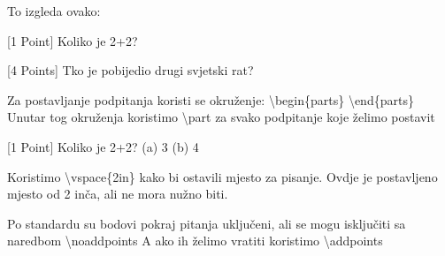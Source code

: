 \documentclass[addpoints,answers]{beamer}
\newcounter{points}
\newenvironment{questions}{\setcounter{points}{0}}{}
\newcommand{\question}[1][1]{\addtocounter{points}{#1}}
\begin{document}
\begin{frame}
\begin{questions}

To izgleda ovako:
\newline
\newline
\question[1]
[1 Point] Koliko je 2+2?
\newline
\newline
\question[4]
[4 Points] Tko je pobijedio drugi svjetski rat?
\end{questions}
\end{frame}




\begin{frame}
Za postavljanje podpitanja koristi se okruženje:
\newline
\newline
\color{blue}
\textbackslash{begin\{parts\}}
\color{black}
\newline
\newline
\color{blue}
\textbackslash{end\{parts\}}
\color{black}
\newline
\newline
Unutar tog okruženja koristimo
\newline
\newline
\color{blue}
\textbackslash{part}
\color{black}
\newline
\newline
za svako podpitanje koje želimo postavit
\end{frame}

\begin{frame}
\begin{questions} 
\question[1]
[1 Point] Koliko je 2+2?\newline
(a) 3 \newline
(b)	4 
\end{questions}
\end{frame}


\begin{frame}
Koristimo
\newline
\newline
\color{blue}
\textbackslash{vspace\{2in\}} 
\color{black}
\newline
\newline
kako bi ostavili mjesto za pisanje. Ovdje je postavljeno mjesto od 2 inča, ali ne mora nužno biti.
\end{frame}

\begin{frame}
Po standardu su bodovi pokraj pitanja uključeni, ali se mogu isključiti sa naredbom
\newline
\newline
\color{blue}
\textbackslash{noaddpoints}
\color{black}
\newline
\newline
A ako ih želimo vratiti koristimo 
\newline
\newline
\color{blue}
\textbackslash{addpoints}
\color{black}
\end{frame}
\end{document}
